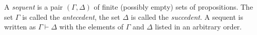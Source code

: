 

\setcounter{section}{2}
\setcounter{subsection}{4}
\setcounter{dfn}{6}

\begin{dfn}
A \emph{sequent} is a pair $(\Gamma, \Delta)$ of finite (possibly empty) sets of propositions.
The set $\Gamma$ is called the \emph{antecedent}, the set $\Delta$ is called the \emph{succedent}.
A sequent is written as $\Gamma \vdash \Delta$ with the elements of $\Gamma$ and $\Delta$ listed in an arbitrary order.
\end{dfn}

